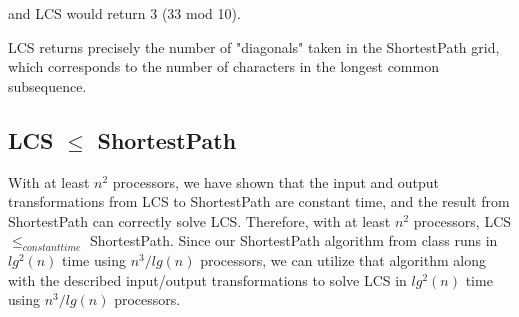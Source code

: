 \documentclass[a4paper]{article}
\begin{document}
and LCS would return 3 (33 mod 10).

LCS returns precisely the number of "diagonals" taken in the ShortestPath grid, which corresponds to the number of characters in the longest common subsequence.

\subsection{LCS $\leq$ ShortestPath}
With at least $n^2$ processors, we have shown that the input and output transformations from LCS to ShortestPath are constant time, and the result from ShortestPath can correctly solve LCS. Therefore, with at least $n^2$ processors, LCS $\leq _{constant time}$ ShortestPath. Since our ShortestPath algorithm from class runs in $lg^2(n)$ time using $n^3/lg(n)$ processors, we can utilize that algorithm along with the described input/output transformations to solve LCS in $lg^2(n)$ time using $n^3/lg(n)$ processors.
\end{document}
